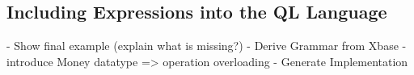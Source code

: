 \subsection{Including Expressions into the QL Language}

- Show final example (explain what is missing?)
- Derive Grammar from Xbase
- introduce Money datatype => operation overloading
- Generate Implementation

